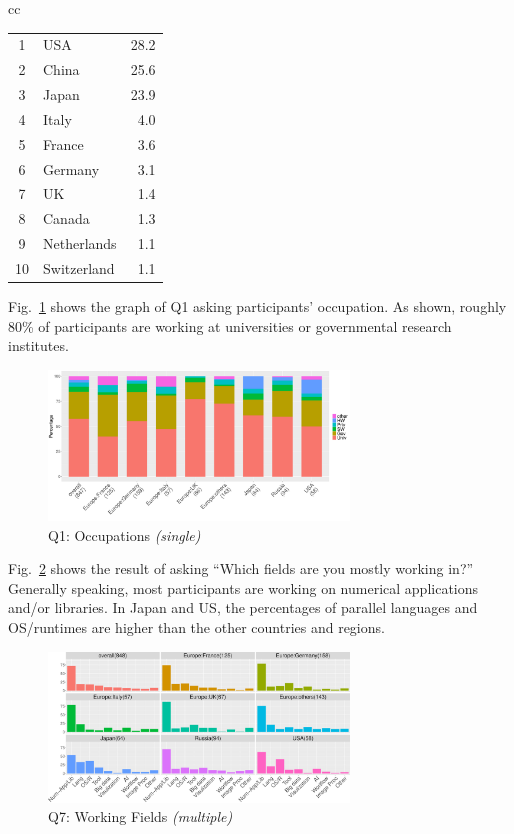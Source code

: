 \documentclass[conference,10pt,letterpaper]{IEEEtran}
\begin{document}
\begin{table}[htb]
\begin{center}
\begin{tabular}[t]{cc}
\begin{minipage}[t]{0.5\hsize}
\begin{center}
\begin{tabular}{c|l|r}
\hline%
1  & USA 	  & 28.2 \\%
2  & China 	  & 25.6 \\%
3  & Japan 	  & 23.9 \\%
4  & Italy	  & 4.0  \\%
5  & France	  & 3.6  \\%
6  & Germany 	  & 3.1  \\%
7  & UK		  & 1.4  \\%
8  & Canada	  & 1.3  \\%
9  & Netherlands  & 1.1  \\%
10 & Switzerland  & 1.1  \\%
\hline%
\end{tabular}%
\end{center}%
\end{minipage}%
%
\end{tabular}%
\end{center}%
\end{table}%
%
%
Fig.~\ref{fig:occupations} shows the graph of Q1 asking participants'
occupation. As shown, roughly 80\% of participants are working at 
universities or governmental research institutes.
%
\begin{figure}[htb]
\begin{center}
\includegraphics[width=8cm]{R-scripts/Q1.pdf}
\caption{Q1: Occupations {\it(single)}}
\label{fig:occupations}
\end{center}
\end{figure}

Fig.~\ref{fig:working-fields} shows the result of asking ``Which
fields are you mostly working in?'' Generally speaking, most
participants are working on numerical applications and/or
libraries. In Japan and US, the percentages of parallel languages and
OS/runtimes are higher than the other countries and regions.

\begin{figure}[htb]
\begin{center}
\includegraphics[width=8cm]{R-scripts/Q7.pdf}
\caption{Q7: Working Fields {\it(multiple)}}
\label{fig:working-fields}
\end{center}
\end{figure}
\end{document}
